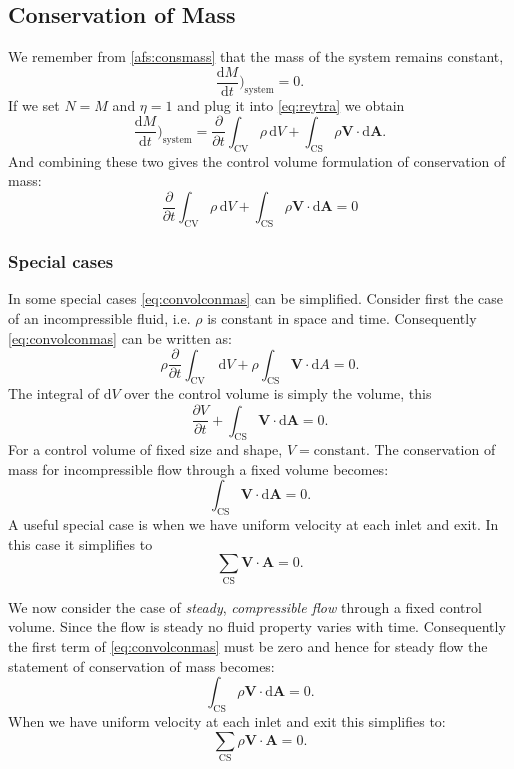 \subsection{Conservation of Mass}
We remember from \autoref{afs:consmass} that the mass of the system remains constant,
\[ 
\frac{\mathrm{d}M}{\mathrm{d}t} \bigg)_{\mathrm{system}} = 0
.\]
If we set $N = M$ and $\eta = 1$ and plug it into \autoref{eq:reytra} we obtain
\[ 
\frac{\mathrm{d}M}{\mathrm{d}t} \bigg)_{\mathrm{system}} = \frac{\partial }{\partial t} \int_{\mathrm{CV}} \rho \, \mathrm{d}V + \int_{\mathrm{CS}} \rho \textbf{V} \cdot \mathrm{d}\textbf{A} 
.\]
And combining these two gives the control volume formulation of conservation of mass:
\begin{equation} \label{eq:convolconmas}
  \frac{\partial}{\partial t} \int_{\mathrm{CV}} \rho \, \mathrm{d}V + \int_{\mathrm{CS}} \rho \textbf{V} \cdot \mathrm{d}\textbf{A} = 0
\end{equation}


\subsubsection{Special cases}
In some special cases \autoref{eq:convolconmas} can be simplified. Consider first the case of an incompressible fluid, i.e. $\rho$ is constant in space and time. Consequently \autoref{eq:convolconmas} can be written as:
\[ 
\rho \frac{\partial }{\partial t} \int_{\mathrm{CV}} \, \mathrm{d}V + \rho \int_{\mathrm{CS}} \textbf{V} \cdot \mathrm{d}A = 0
.\]
The integral of $\mathrm{d}V$ over the control volume is simply the volume, this
\[ 
\frac{\partial V}{\partial t} + \int_{\mathrm{CS}} \textbf{V} \cdot \mathrm{d}\textbf{A} = 0
.\]
For a control volume of fixed size and shape, $V = \mathrm{constant}$. The conservation of mass for incompressible flow through a fixed volume becomes:
\[ 
\int_{\mathrm{CS}} \textbf{V} \cdot \mathrm{d}\textbf{A} = 0
.\]
A useful special case is when we have uniform velocity at each inlet and exit. In this case it simplifies to
\[ 
\sum_{\mathrm{CS}} \textbf{V} \cdot \textbf{A} = 0
.\]

We now consider the case of \textit{steady}, \textit{compressible flow} through a fixed control volume. Since the flow is steady no fluid property varies with time. Consequently the first term of \autoref{eq:convolconmas} must be zero and hence for steady flow the statement of conservation of mass becomes:
\[ 
\int_{\mathrm{CS}} \rho \textbf{V} \cdot \mathrm{d}\textbf{A} = 0
.\]
When we have uniform velocity at each inlet and exit this simplifies to:
\[ 
\sum_{\mathrm{CS}} \rho \textbf{V} \cdot \textbf{A} = 0
.\]



